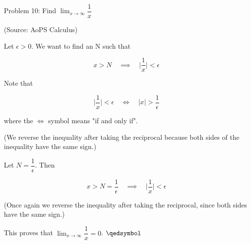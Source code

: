 \usepackage{amsthm}

Problem 10: Find $\lim_{x \rightarrow \infty} \dfrac{1}{x}$

(Source: AoPS Calculus)

Let $\epsilon > 0$. We want to find an N such that 

$$ x > N \quad \implies \quad \Bigg|\frac{1}{x}\Bigg| < \epsilon $$

Note that

$$ \Bigg|\frac{1}{x}\Bigg| < \epsilon \quad \Leftrightarrow \quad |x| > \frac{1}{\epsilon} $$

where the $\Leftrightarrow$ symbol means "if and only if".

(We reverse the inequality after taking the reciprocal because both sides of the inequality have the same sign.)

Let $N = \dfrac{1}{\epsilon}$. Then

$$ x > N = \frac{1}{\epsilon} \quad \implies \quad \Bigg|\frac{1}{x}\Bigg| < \epsilon $$

(Once again we reverse the inequality after taking the reciprocal, since both sides have the same sign.)

This proves that $\lim_{x \rightarrow \infty} \dfrac{1}{x} = 0$. $\qedsymbol$

